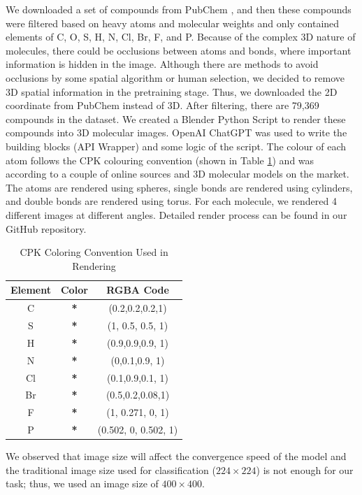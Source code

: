 \documentclass[12pt]{article}
\begin{document}
We downloaded a set of compounds from PubChem \autocite{kim_pubchem_2023}, and then these compounds were filtered based on heavy atoms and molecular weights and only contained elements of C, O, S, H, N, Cl, Br, F, and P. Because of the complex 3D nature of molecules, there could be occlusions between atoms and bonds, where important information is hidden in the image. Although there are methods to avoid occlusions by some spatial algorithm or human selection, we decided to remove 3D spatial information in the pretraining stage. Thus, we downloaded the 2D coordinate from PubChem instead of 3D.  
After filtering, there are 79,369 compounds in the dataset. We created a Blender Python Script to render these compounds into 3D molecular images. OpenAI ChatGPT was used to write the building blocks (API Wrapper) and some logic of the script. The colour of each atom follows the CPK colouring convention (shown in Table \ref{cpk}) and was according to a couple of online sources and 3D molecular models on the market. The atoms are rendered using spheres, single bonds are rendered using cylinders, and double bonds are rendered using torus. For each molecule, we rendered 4 different images at different angles. Detailed render process can be found in our GitHub repository. 
\begin{table}[]
    \centering
    \begin{tabular}{c|c|c}
        Element & Color & RGBA Code \\ \hline
C & \textcolor{color0}{\textbf{*}} & (0.2,0.2,0.2,1)\\
S & \textcolor{color2}{\textbf{*}} & (1, 0.5, 0.5, 1)\\
H & \textcolor{color3}{\textbf{*}} & (0.9,0.9,0.9, 1)\\
N & \textcolor{color4}{\textbf{*}} & (0,0.1,0.9, 1)\\
Cl &  \textcolor{color5}{\textbf{*}} & (0.1,0.9,0.1, 1)\\
Br & \textcolor{color6}{\textbf{*}} & (0.5,0.2,0.08,1)\\
F & \textcolor{color7}{\textbf{*}} & (1, 0.271, 0, 1)\\
P & \textcolor{color8}{\textbf{*}} & (0.502, 0, 0.502, 1)\\
    \end{tabular}
    \caption{CPK Coloring Convention Used in Rendering}
    \label{cpk}
\end{table}
We observed that image size will affect the convergence speed of the model and the traditional image size used for classification ($224\times224$) is not enough for our task; thus, we used an image size of $400\times400$. 
\end{document}
